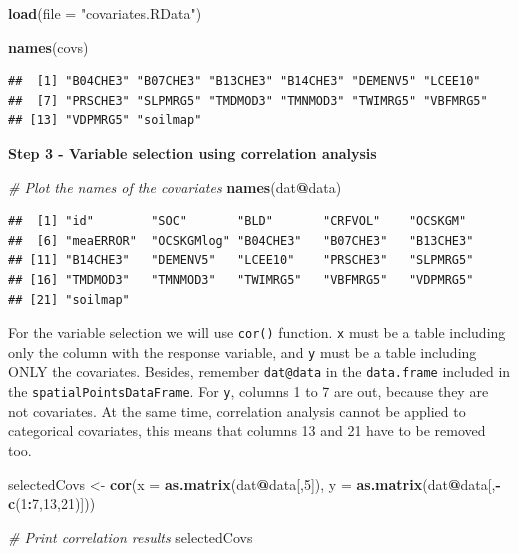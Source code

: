 \documentclass[10pt,b5paper,]{book}
\newenvironment{Shaded}{\begin{snugshade}}{\end{snugshade}}
\newcommand{\CommentTok}[1]{\textcolor[rgb]{0.56,0.35,0.01}{\textit{#1}}}
\newcommand{\DataTypeTok}[1]{\textcolor[rgb]{0.13,0.29,0.53}{#1}}
\newcommand{\DecValTok}[1]{\textcolor[rgb]{0.00,0.00,0.81}{#1}}
\newcommand{\KeywordTok}[1]{\textcolor[rgb]{0.13,0.29,0.53}{\textbf{#1}}}
\newcommand{\NormalTok}[1]{#1}
\newcommand{\OperatorTok}[1]{\textcolor[rgb]{0.81,0.36,0.00}{\textbf{#1}}}
\newcommand{\StringTok}[1]{\textcolor[rgb]{0.31,0.60,0.02}{#1}}
\theoremstyle{definition}
\theoremstyle{definition}
\theoremstyle{definition}
\theoremstyle{remark}
\begin{document}
\begin{Shaded}
\begin{Highlighting}[]
\KeywordTok{load}\NormalTok{(}\DataTypeTok{file =} \StringTok{"covariates.RData"}\NormalTok{)}

\KeywordTok{names}\NormalTok{(covs)}
\end{Highlighting}
\end{Shaded}

\begin{verbatim}
##  [1] "B04CHE3" "B07CHE3" "B13CHE3" "B14CHE3" "DEMENV5" "LCEE10" 
##  [7] "PRSCHE3" "SLPMRG5" "TMDMOD3" "TMNMOD3" "TWIMRG5" "VBFMRG5"
## [13] "VDPMRG5" "soilmap"
\end{verbatim}

\textbf{Step 3 - Variable selection using correlation analysis}

\begin{Shaded}
\begin{Highlighting}[]
\CommentTok{# Plot the names of the covariates}
\KeywordTok{names}\NormalTok{(dat}\OperatorTok{@}\NormalTok{data)}
\end{Highlighting}
\end{Shaded}

\begin{verbatim}
##  [1] "id"        "SOC"       "BLD"       "CRFVOL"    "OCSKGM"   
##  [6] "meaERROR"  "OCSKGMlog" "B04CHE3"   "B07CHE3"   "B13CHE3"  
## [11] "B14CHE3"   "DEMENV5"   "LCEE10"    "PRSCHE3"   "SLPMRG5"  
## [16] "TMDMOD3"   "TMNMOD3"   "TWIMRG5"   "VBFMRG5"   "VDPMRG5"  
## [21] "soilmap"
\end{verbatim}

For the variable selection we will use \texttt{cor()} function.
\texttt{x} must be a table including only the column with the response
variable, and \texttt{y} must be a table including ONLY the covariates.
Besides, remember \texttt{dat@data} in the \texttt{data.frame} included
in the \texttt{spatialPointsDataFrame}. For \texttt{y}, columns 1 to 7
are out, because they are not covariates. At the same time, correlation
analysis cannot be applied to categorical covariates, this means that
columns 13 and 21 have to be removed too.

\begin{Shaded}
\begin{Highlighting}[]
\NormalTok{selectedCovs <-}\StringTok{ }\KeywordTok{cor}\NormalTok{(}\DataTypeTok{x =} \KeywordTok{as.matrix}\NormalTok{(dat}\OperatorTok{@}\NormalTok{data[,}\DecValTok{5}\NormalTok{]),}
           \DataTypeTok{y =} \KeywordTok{as.matrix}\NormalTok{(dat}\OperatorTok{@}\NormalTok{data[,}\OperatorTok{-}\KeywordTok{c}\NormalTok{(}\DecValTok{1}\OperatorTok{:}\DecValTok{7}\NormalTok{,}\DecValTok{13}\NormalTok{,}\DecValTok{21}\NormalTok{)]))}

\CommentTok{# Print correlation results}
\NormalTok{selectedCovs}
\end{Highlighting}
\end{Shaded}
\end{document}
